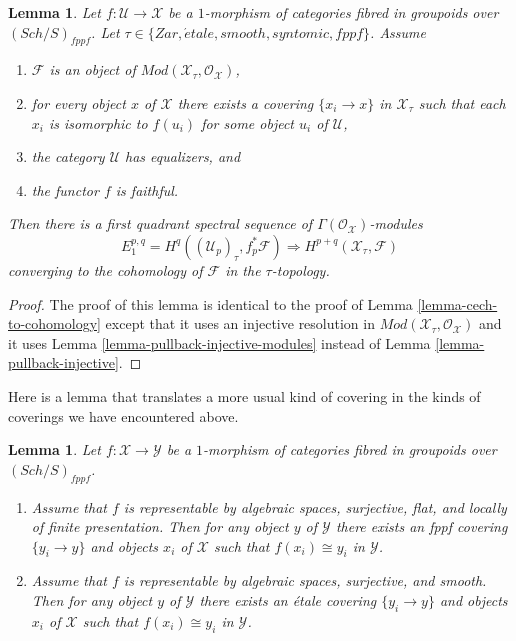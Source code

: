 \documentclass{stacks-project}
\theoremstyle{plain}
\newtheorem{lemma}[subsection]{Lemma}
\theoremstyle{definition}
\theoremstyle{remark}
\numberwithin{equation}{subsection}
\def\Sch{\mathit{Sch}}
\def\etale{{\acute{e}tale}}
\begin{document}
\begin{lemma}
\label{lemma-cech-to-cohomology-modules}
Let $f : \mathcal{U} \to \mathcal{X}$ be a $1$-morphism of categories fibred
in groupoids over $(\Sch/S)_{fppf}$. Let
$\tau \in \{Zar, \etale, smooth, syntomic, fppf\}$.
Assume
\begin{enumerate}
\item $\mathcal{F}$ is an object of
$\textit{Mod}(\mathcal{X}_\tau, \mathcal{O}_\mathcal{X})$,
\item for every object $x$ of $\mathcal{X}$ there exists a covering
$\{x_i \to x\}$ in $\mathcal{X}_\tau$ such that each $x_i$ is isomorphic
to $f(u_i)$ for some object $u_i$ of $\mathcal{U}$,
\item the category $\mathcal{U}$ has equalizers, and
\item the functor $f$ is faithful.
\end{enumerate}
Then there is a first quadrant spectral sequence of
$\Gamma(\mathcal{O}_\mathcal{X})$-modules
$$
E_1^{p, q} = H^q((\mathcal{U}_p)_\tau, f_p^*\mathcal{F})
\Rightarrow
H^{p + q}(\mathcal{X}_\tau, \mathcal{F})
$$
converging to the cohomology of $\mathcal{F}$ in the $\tau$-topology.
\end{lemma}

\begin{proof}
The proof of this lemma is identical to the proof of
Lemma \ref{lemma-cech-to-cohomology}
except that it uses an injective resolution in
$\textit{Mod}(\mathcal{X}_\tau, \mathcal{O}_\mathcal{X})$
and it uses
Lemma \ref{lemma-pullback-injective-modules}
instead of
Lemma \ref{lemma-pullback-injective}.
\end{proof}

\noindent
Here is a lemma that translates a more usual kind of covering in the
kinds of coverings we have encountered above.

\begin{lemma}
\label{lemma-surjective-flat-locally-finite-presentation}
Let $f : \mathcal{X} \to \mathcal{Y}$ be a $1$-morphism of
categories fibred in groupoids over $(\Sch/S)_{fppf}$.
\begin{enumerate}
\item Assume that $f$ is representable by algebraic spaces, surjective,
flat, and locally of finite presentation. Then for any object $y$ of
$\mathcal{Y}$ there exists an fppf covering $\{y_i \to y\}$ and objects
$x_i$ of $\mathcal{X}$ such that $f(x_i) \cong y_i$ in $\mathcal{Y}$.
\item Assume that $f$ is representable by algebraic spaces, surjective,
and smooth. Then for any object $y$ of
$\mathcal{Y}$ there exists an \'etale covering $\{y_i \to y\}$ and objects
$x_i$ of $\mathcal{X}$ such that $f(x_i) \cong y_i$ in $\mathcal{Y}$.
\end{enumerate}
\end{lemma}
\end{document}
